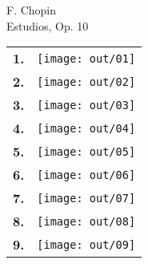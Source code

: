 \documentclass[a4paper,13pt,oneside,headinclude,titlepage]{article} %
\newcommand{\imgw}{0.67}
\newlength{\colw}
\newcommand{\tn}{\tabularnewline}
\begin{document}
\begin{center}
\vfill
{\huge F. Chopin}\\[1ex]
{\huge Estudios, Op. 10}\\[1ex]
\vfill
\begin{tabular}{>{\bfseries}m{2ex}m{\colw}}
1.&\texttt{[image: out/01]}\tn
2.&\texttt{[image: out/02]}\tn
3.&\texttt{[image: out/03]}\tn
4.&\texttt{[image: out/04]}\tn
5.&\texttt{[image: out/05]}\tn
6.&\texttt{[image: out/06]}\tn
7.&\texttt{[image: out/07]}\tn
8.&\texttt{[image: out/08]}\tn
9.&\texttt{[image: out/09]}\tn
\end{tabular}
\end{center}
\vfill
\end{document}
